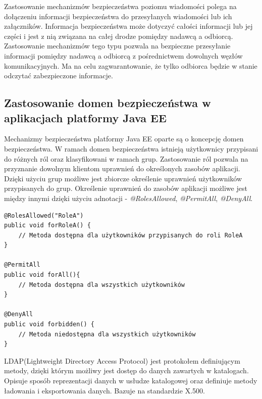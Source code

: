 		Zastosowanie mechanizmów bezpieczeństwa poziomu wiadomości polega na dołączeniu informacji bezpieczeństwa do przesyłanych wiadomości lub ich załączników. Informacja bezpieczeństwa może dotyczyć całości informacji lub jej części i jest z nią związana na całej drodze pomiędzy nadawcą a odbiorcą. Zastosowanie mechanizmów tego typu pozwala na bezpieczne przesyłanie informacji pomiędzy nadawcą a odbiorcą z pośrednictwem dowolnych węzłów komunikacyjnych. Ma na celu zagwarantowanie, że tylko odbiorca będzie w stanie odczytać zabezpieczone informacje.

	\subsection{Zastosowanie domen bezpieczeństwa w aplikacjach platformy Java EE}

		Mechanizmy bezpieczeństwa platformy Java EE oparte są o koncepcję domen bezpieczeństwa. W ramach domen bezpieczeństwa istnieją użytkownicy przypisani do różnych ról oraz klasyfikowani w ramach grup. Zastosowanie ról pozwala na przyznanie dowolnym klientom uprawnień do określonych zasobów aplikacji. Dzięki użyciu grup możliwe jest zbiorcze określenie uprawnień użytkowników przypisanych do grup. Określenie uprawnień do zasobów aplikacji możliwe jest między innymi dzięki użyciu adnotacji - \textit{@RolesAllowed}, \textit{@PermitAll}, \textit{@DenyAll}.
		
		\lstset{language=Java}
		\begin{lstlisting}
@RolesAllowed("RoleA")
public void forRoleA() {
	// Metoda dostępna dla użytkowników przypisanych do roli RoleA
}

@PermitAll
public void forAll(){
	// Metoda dostępna dla wszystkich użytkowników
}

@DenyAll
public void forbidden() {
	// Metoda niedostępna dla wszystkich użytkowników
}
		\end{lstlisting}		


\label{sec:ldap}

	LDAP(Lightweight Directory Access Protocol) jest protokołem definiującym metody, dzięki którym możliwy jest dostęp do danych zawartych w katalogach\cite{ZyTrax13}. Opisuje sposób reprezentacji danych w usłudze katalogowej oraz definiuje metody ładowania i eksportowania danych. Bazuje na standardzie X.500.

